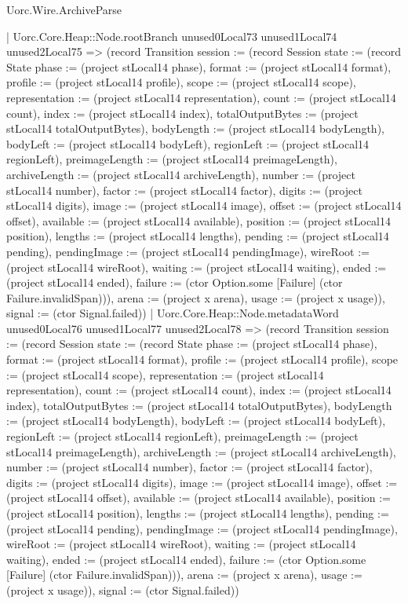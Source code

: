\begin{lexlean}{Uorc.Wire.ArchiveParse}
\begin{semanticmodule}
{            | Uorc.Core.Heap::Node.rootBranch unused0Local73 unused1Local74 unused2Local75 => (record Transition {session := (record Session {state := (record State {phase := (project stLocal14 phase), format := (project stLocal14 format), profile := (project stLocal14 profile), scope := (project stLocal14 scope), representation := (project stLocal14 representation), count := (project stLocal14 count), index := (project stLocal14 index), totalOutputBytes := (project stLocal14 totalOutputBytes), bodyLength := (project stLocal14 bodyLength), bodyLeft := (project stLocal14 bodyLeft), regionLeft := (project stLocal14 regionLeft), preimageLength := (project stLocal14 preimageLength), archiveLength := (project stLocal14 archiveLength), number := (project stLocal14 number), factor := (project stLocal14 factor), digits := (project stLocal14 digits), image := (project stLocal14 image), offset := (project stLocal14 offset), available := (project stLocal14 available), position := (project stLocal14 position), lengths := (project stLocal14 lengths), pending := (project stLocal14 pending), pendingImage := (project stLocal14 pendingImage), wireRoot := (project stLocal14 wireRoot), waiting := (project stLocal14 waiting), ended := (project stLocal14 ended), failure := (ctor Option.some [Failure] (ctor Failure.invalidSpan))}), arena := (project x arena), usage := (project x usage)}), signal := (ctor Signal.failed)})
            | Uorc.Core.Heap::Node.metadataWord unused0Local76 unused1Local77 unused2Local78 => (record Transition {session := (record Session {state := (record State {phase := (project stLocal14 phase), format := (project stLocal14 format), profile := (project stLocal14 profile), scope := (project stLocal14 scope), representation := (project stLocal14 representation), count := (project stLocal14 count), index := (project stLocal14 index), totalOutputBytes := (project stLocal14 totalOutputBytes), bodyLength := (project stLocal14 bodyLength), bodyLeft := (project stLocal14 bodyLeft), regionLeft := (project stLocal14 regionLeft), preimageLength := (project stLocal14 preimageLength), archiveLength := (project stLocal14 archiveLength), number := (project stLocal14 number), factor := (project stLocal14 factor), digits := (project stLocal14 digits), image := (project stLocal14 image), offset := (project stLocal14 offset), available := (project stLocal14 available), position := (project stLocal14 position), lengths := (project stLocal14 lengths), pending := (project stLocal14 pending), pendingImage := (project stLocal14 pendingImage), wireRoot := (project stLocal14 wireRoot), waiting := (project stLocal14 waiting), ended := (project stLocal14 ended), failure := (ctor Option.some [Failure] (ctor Failure.invalidSpan))}), arena := (project x arena), usage := (project x usage)}), signal := (ctor Signal.failed)})
}
\end{semanticmodule}
\end{lexlean}
